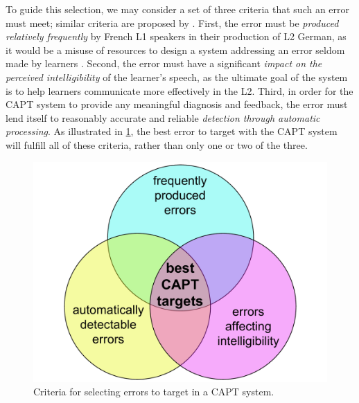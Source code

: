 	To guide this selection, we may consider %
a set of three criteria that such an error must meet; similar criteria are proposed by \textcite{Cucchiarini2009}.
%
First, 
the error must be \textit{produced relatively frequently} by French L1 speakers in their production of L2 German, as it would be a misuse of resources to design a system addressing an error seldom made by learners \citep{Neri2002}.
Second,
the error must have a significant \textit{impact on the perceived intelligibility} of the learner's speech, %
as the ultimate goal of the system is to help learners communicate more effectively in the L2.
Third,
in order for the CAPT system to provide any meaningful diagnosis and feedback, the error must lend itself to reasonably accurate and reliable  \textit{detection through automatic processing}. 
%
%
%
As illustrated in \cref{fig:errors}, the best error to target with the CAPT system will fulfill all of these criteria, rather than only one or two of the three. 

		\begin{figure}[htb]
			\centering
			\includegraphics[width=.7\textwidth]{../img/error-venn}
			\caption{Criteria for selecting errors to target in a CAPT system.}
			\label{fig:errors}
		\end{figure}

